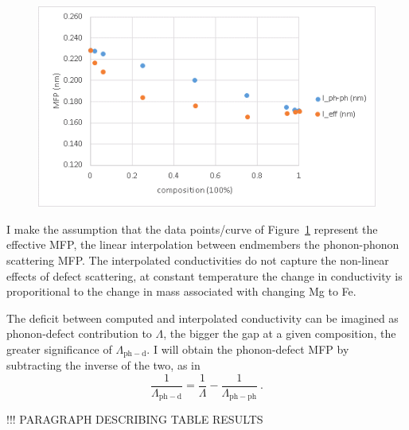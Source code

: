 \begin{figure}[h!]
  \includegraphics[width=\linewidth]{Figures/kc_4000_mfp_norm.png}
  \caption[kc 4000 mfp norm]{}
  \label{kc_4000_mfp_norm}
\end{figure}

I make the assumption that the data points/curve of Figure~\ref{kc_4000_mfp_norm} represent the effective MFP, the linear interpolation between endmembers the phonon-phonon scattering MFP. The interpolated conductivities do not capture the non-linear effects of defect scattering, at constant temperature the change in conductivity is proporitional to the change in mass associated with changing Mg to Fe.

The deficit between computed and interpolated conductivity can be imagined as phonon-defect contribution to $\Lambda$, the bigger the gap at a given composition, the greater significance of $\Lambda_{\mathrm{ph-d}}$. I will obtain the phonon-defect MFP by subtracting the inverse of the two, as in 
%
\begin{equation}
\frac{1}{\Lambda_{\mathrm{ph-d}}}=\frac{1}{\Lambda}-\frac{1}{\Lambda_{\mathrm{ph-ph}}}\ .
\label{eq:matth_mfp_mod2}
\end{equation}


!!! PARAGRAPH DESCRIBING TABLE RESULTS


